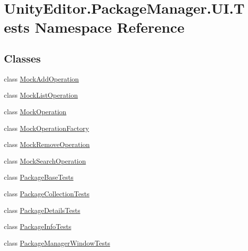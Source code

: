 \hypertarget{namespace_unity_editor_1_1_package_manager_1_1_u_i_1_1_tests}{}\section{Unity\+Editor.\+Package\+Manager.\+U\+I.\+Tests Namespace Reference}
\label{namespace_unity_editor_1_1_package_manager_1_1_u_i_1_1_tests}
\subsection*{Classes}
\begin{DoxyCompactItemize}
\item 
class \mbox{\hyperlink{class_unity_editor_1_1_package_manager_1_1_u_i_1_1_tests_1_1_mock_add_operation}{Mock\+Add\+Operation}}
\item 
class \mbox{\hyperlink{class_unity_editor_1_1_package_manager_1_1_u_i_1_1_tests_1_1_mock_list_operation}{Mock\+List\+Operation}}
\item 
class \mbox{\hyperlink{class_unity_editor_1_1_package_manager_1_1_u_i_1_1_tests_1_1_mock_operation}{Mock\+Operation}}
\item 
class \mbox{\hyperlink{class_unity_editor_1_1_package_manager_1_1_u_i_1_1_tests_1_1_mock_operation_factory}{Mock\+Operation\+Factory}}
\item 
class \mbox{\hyperlink{class_unity_editor_1_1_package_manager_1_1_u_i_1_1_tests_1_1_mock_remove_operation}{Mock\+Remove\+Operation}}
\item 
class \mbox{\hyperlink{class_unity_editor_1_1_package_manager_1_1_u_i_1_1_tests_1_1_mock_search_operation}{Mock\+Search\+Operation}}
\item 
class \mbox{\hyperlink{class_unity_editor_1_1_package_manager_1_1_u_i_1_1_tests_1_1_package_base_tests}{Package\+Base\+Tests}}
\item 
class \mbox{\hyperlink{class_unity_editor_1_1_package_manager_1_1_u_i_1_1_tests_1_1_package_collection_tests}{Package\+Collection\+Tests}}
\item 
class \mbox{\hyperlink{class_unity_editor_1_1_package_manager_1_1_u_i_1_1_tests_1_1_package_details_tests}{Package\+Details\+Tests}}
\item 
class \mbox{\hyperlink{class_unity_editor_1_1_package_manager_1_1_u_i_1_1_tests_1_1_package_info_tests}{Package\+Info\+Tests}}
\item 
class \mbox{\hyperlink{class_unity_editor_1_1_package_manager_1_1_u_i_1_1_tests_1_1_package_manager_window_tests}{Package\+Manager\+Window\+Tests}}

\end{DoxyCompactItemize}
